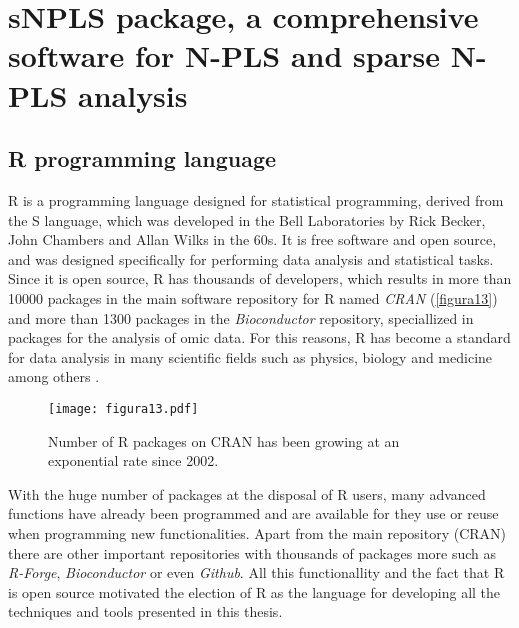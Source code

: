 
\chapter[sNPLS package, a comprehensive software for N-PLS and sparse N-PLS analysis]{sNPLS package, a comprehensive software for N-PLS and sparse N-PLS analysis}
\label{chapter:package}


\section{R programming language}
R \parencite{ihaka1996r, rsoftware} is a programming language designed for statistical programming, derived from the S language, which was developed in the Bell Laboratories by Rick Becker, John Chambers and Allan Wilks in the 60s. It is free software and open source, and was designed specifically for performing data analysis and statistical tasks. Since it is open source, R has thousands of developers, which results in more than 10000 packages in the main software repository for R named \textit{CRAN} (\autoref{figura13}) and more than 1300 packages in the \textit{Bioconductor} repository, speciallized in packages for the analysis of omic data. For this reasons, R has become a standard for data analysis in many scientific fields such as physics, biology and medicine among others \parencite{goztepe4facto}. 

\begin{figure}[hbtp]
	\centering
\texttt{[image: figura13.pdf]}
\caption{Number of R packages on CRAN has been growing at an exponential rate since 2002.}
\label{figura13}
\end{figure}

With the huge number of packages at the disposal of R users, many advanced functions have already been programmed and are available for they use or reuse when programming new functionalities. Apart from the main repository (CRAN) there are other important repositories with thousands of packages more such as \textit{R-Forge}, \textit{Bioconductor} or even \textit{Github}. All this functionallity and the fact that R is open source motivated the election of R as the language for developing all the techniques and tools presented in this thesis.


